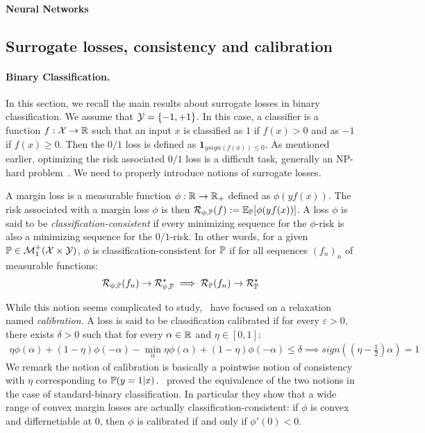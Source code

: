 \paragraph{Neural Networks}
\subsection{Surrogate losses, consistency and calibration} 

\paragraph{Binary Classification.} In this section, we recall the main results about surrogate losses in binary classification. We assume that $\mathcal{Y} = \{-1,+1\}$. In this case, a classifier is a function $f:\mathcal{X}\to\mathbb{R}$ such that an input $x$ is classified as $1$ if $f(x)>0$ and as $-1$ if $f(x)\geq 0$. Then the $0/1$ loss is defined as $\mathbf{1}_{ysign(f(x))\leq0}$. As mentioned earlier, optimizing the risk associated $0/1$ loss is a difficult task, generally an NP-hard problem~\cite{xxx}. We need to properly introduce notions of surrogate losses. 

A margin loss is a measurable function $\phi:\mathbb{R}\to\mathbb{R}_+$ defined as $\phi(yf(x))$. The risk associated with a margin loss $\phi$ is then $\risk_{\phi,\PP}(f):=\mathbb{E}_\PP\left[\phi(yf(x))\right]$. A loss $\phi$ is said to be \emph{classification-consistent} if every minimizing sequence for the $\phi$-risk is also a minimizing sequence for the $0/1$-risk. In other words, for a given $\mathbb{P}\in\mathcal{M}_1^+(\mathcal{X}\times\mathcal{Y})$, $\phi$ is classification-consistent for $\mathbb{P}$ if for all sequences $(f_n)_n$ of measurable functions:
\begin{align}
    \mathcal{R}_{\phi,\mathbb{P}}(f_n)\to \mathcal{R}_{\phi,\mathbb{P}}^\star\implies\mathcal{R}_{\mathbb{P}}(f_n)\to \mathcal{R}_{\mathbb{P}}^\star
\end{align}

 While this notion seems complicated to study,~\cite{bartlett2006convexity,steinwart2007compare} have focused on a relaxation named \emph{calibration}. A loss is said to be classification calibrated if for every $\varepsilon>0$, there exists $\delta>0$ such that for every $\alpha\in\mathbb{R}$ and $\eta\in[0,1]$:
\begin{align*}
    \eta\phi(\alpha)+(1-\eta)\phi(-\alpha)-\min_{\alpha} \eta\phi(\alpha)+(1-\eta)\phi(-\alpha)\leq \delta\implies sign\left((\eta-\frac12)\alpha\right)=1
\end{align*}
We remark the notion of calibration is basically a pointwise notion of consistency with $\eta$ corresponding to $\mathbb{P}(y=1|x)$.~\cite{bartlett2006convexity,steinwart2007compare} proved the equivalence of the two notions in the case of standard-binary classification. In particular they show that a wide range of convex margin losses are actually classification-consistent: if $\phi$ is convex and differnetiable at $0$, then $\phi$ is calibrated if and only if $\phi'(0)<0$.





